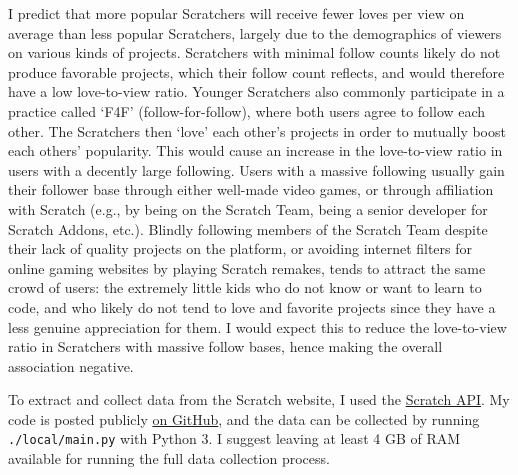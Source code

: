 \documentclass[12pt]{article}
\begin{document}
\begin{flushleft}
	I predict that more popular Scratchers will receive fewer loves per view on average than less popular Scratchers, largely due to the demographics of viewers on various kinds of projects. Scratchers with minimal follow counts likely do not produce favorable projects, which their follow count reflects, and would therefore have a low love-to-view ratio. Younger Scratchers also commonly participate in a practice called ‘F4F’ (follow-for-follow), where both users agree to follow each other. The Scratchers then ‘love’ each other’s projects in order to mutually boost each others’ popularity. This would cause an increase in the love-to-view ratio in users with a decently large following. Users with a massive following usually gain their follower base through either well-made video games, or through affiliation with Scratch (e.g., by being on the Scratch Team, being a senior developer for Scratch Addons, etc.). Blindly following members of the Scratch Team despite their lack of quality projects on the platform, or avoiding internet filters for online gaming websites by playing Scratch remakes, tends to attract the same crowd of users: the extremely little kids who do not know or want to learn to code, and who likely do not tend to love and favorite projects since they have a less genuine appreciation for them. I would expect this to reduce the love-to-view ratio in Scratchers with massive follow bases, hence making the overall association negative.
	
	To extract and collect data from the Scratch website, I used the \hyperlink{https://api.scratch.mit.edu/}{Scratch API}. My code is posted publicly \hyperlink{https://github.com/piano-miles/Scratch-Userdata}{on GitHub}, and the data can be collected by running \texttt{./local/main.py} with Python 3. I suggest leaving at least 4 GB of RAM available for running the full data collection process.
	


\end{flushleft}
\end{document}
